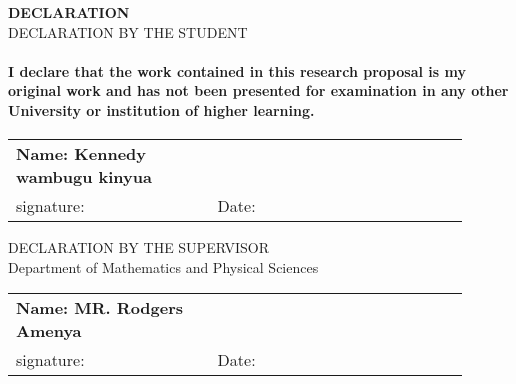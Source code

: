 \begin{titlepage}
\Large \textbf{DECLARATION}\\[0.5cm]
\center 
\large DECLARATION BY THE STUDENT\\
\paragraph{I declare that the work contained in this research proposal is my original work
and has not been presented for examination in any other University or
institution of higher learning.}

\begin{tabular}{p{0.4\linewidth}p{0.5\linewidth}}
  \textbf{Name: Kennedy wambugu kinyua} \\
  \vspace{12pt}
  signature: \dotfill & \vspace{12pt}  Date: \dotfill \\
\end{tabular}
\smallskip
\large DECLARATION BY THE SUPERVISOR\\
Department of Mathematics and Physical Sciences \\
\begin{tabular}{p{0.4\linewidth}p{0.5\linewidth}}
  \textbf{Name: MR. Rodgers  Amenya} \\
  \vspace{12pt}
  signature: \dotfill & \vspace{12pt}  Date: \dotfill \\
\end{tabular}
\end{titlepage}
